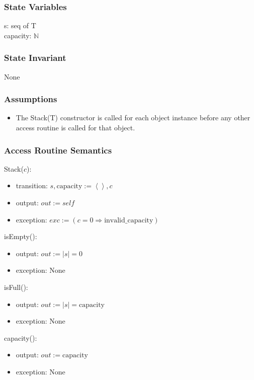 \documentclass[12pt]{article}
\newcommand{\Implies}{\Rightarrow}
\begin{document}
\subsubsection*{State Variables}

s: seq of T\\
capacity: $\mathbb{N}$

\subsubsection*{State Invariant}

None

\subsubsection*{Assumptions}

\begin{itemize}
    \item The Stack(T) constructor is called for each object instance before
        any other access routine is called for that object.
\end{itemize}

\subsubsection*{Access Routine Semantics}

\noindent Stack($c$):
\begin{itemize}
    \item transition: $s, \mbox{capacity} := \left<\right>, c$
    \item output: $out := \mathit{self}$
    \item exception: $exc := (c = 0 \Implies \mbox{invalid\_capacity})$
\end{itemize}

\noindent isEmpty():
\begin{itemize}
    \item output: $out := |s| = 0$
    \item exception: None
\end{itemize}

\noindent isFull():
\begin{itemize}
    \item output: $out := |s| = \mbox{capacity}$
    \item exception: None
\end{itemize}

\noindent capacity():
\begin{itemize}
    \item output: $out := \mbox{capacity}$
    \item exception: None
\end{itemize}
\end{document}

